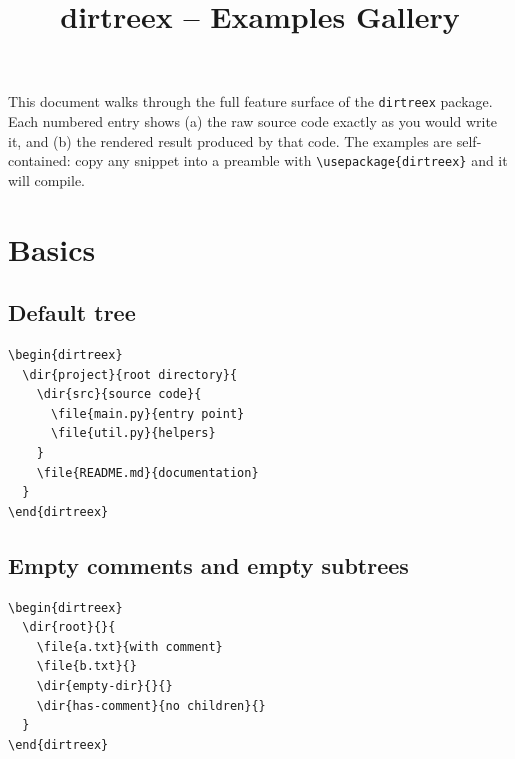 \documentclass[11pt]{article}
\title{\textbf{dirtreex} -- Examples Gallery}
\author{}
\date{}
\begin{document}
\maketitle

\noindent
This document walks through the full feature surface of the \texttt{dirtreex} package. Each numbered entry shows (a) the raw source code exactly as you would write it, and (b) the rendered result produced by that code. The examples are self-contained: copy any snippet into a preamble with \verb|\usepackage{dirtreex}| and it will compile.

\tableofcontents

\clearpage

\section{Basics}

\subsection{Default tree}

\begin{Verbatim}
\begin{dirtreex}
  \dir{project}{root directory}{
    \dir{src}{source code}{
      \file{main.py}{entry point}
      \file{util.py}{helpers}
    }
    \file{README.md}{documentation}
  }
\end{dirtreex}
\end{Verbatim}

\begin{dirtreex}
\end{dirtreex}

\subsection{Empty comments and empty subtrees}

\begin{Verbatim}
\begin{dirtreex}
  \dir{root}{}{
    \file{a.txt}{with comment}
    \file{b.txt}{}
    \dir{empty-dir}{}{}
    \dir{has-comment}{no children}{}
  }
\end{dirtreex}
\end{Verbatim}
\end{document}
